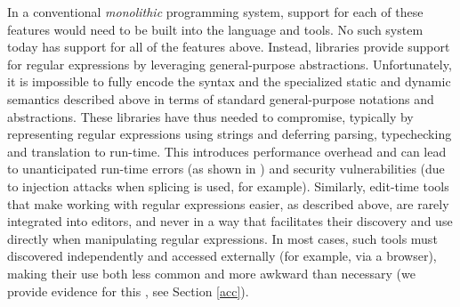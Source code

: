 %
%
In a conventional \emph{monolithic} programming system, support for each of these features would need to be built into the language and tools. No such system today has support for all of the features above. Instead, libraries  provide support for regular expressions by leveraging general-purpose abstractions. Unfortunately, it is impossible to fully encode the syntax and the specialized static and dynamic semantics described above in terms of standard general-purpose notations and abstractions. These libraries have thus needed to compromise, typically by representing regular expressions using strings and deferring parsing, typechecking and translation to run-time. This introduces performance overhead and can lead to unanticipated run-time errors (as shown in \cite{regex-type-system}) and security vulnerabilities (due to injection attacks when splicing is used, for example). Similarly, edit-time tools that make working with regular expressions easier, as described above, are rarely integrated into editors, and never in a way that facilitates their discovery and use directly when manipulating regular expressions. In most cases, such tools must discovered independently and accessed externally (for example, via a browser), making their use both less common and more awkward than necessary (we provide evidence for this \cite{active-code-completion}, see Section \ref{acc}).

